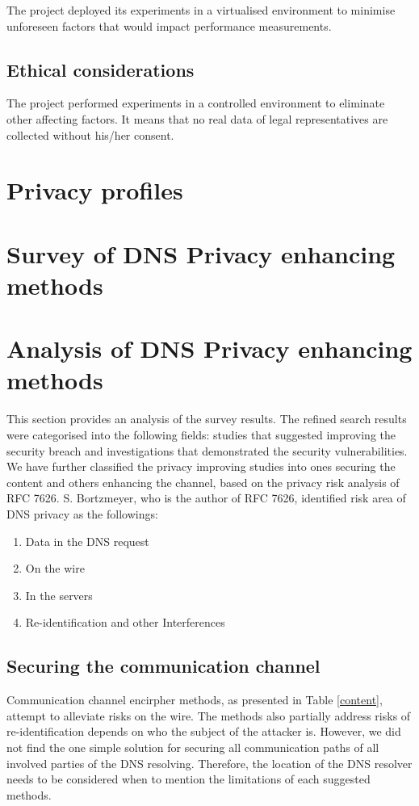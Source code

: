 \documentclass[a4paper,12pt]{article}
\begin{document}
The project deployed its experiments in a virtualised environment to minimise unforeseen factors that would impact performance measurements.

\subsection{Ethical considerations}
The project performed experiments in a controlled environment to eliminate other affecting factors. It means that no real data of legal representatives are collected without his/her consent. 

\newpage
\section{Privacy profiles}

\newpage
\section{Survey of DNS Privacy enhancing methods}

\section{Analysis of DNS Privacy enhancing methods}
This section provides an analysis of the survey results.
The refined search results were categorised into the following fields: studies that suggested improving the security breach and investigations that demonstrated the security vulnerabilities.
We have further classified the privacy improving studies into ones securing the content and others enhancing the channel, based on the privacy risk analysis of RFC 7626.
S. Bortzmeyer, who is the author of RFC 7626, identified risk area of DNS privacy as the followings\cite{rfc7626}: 
\begin{enumerate}
    \item Data in the DNS request
    \item On the wire
    \item In the servers
    \item Re-identification and other Interferences
\end{enumerate}

\subsection{Securing the communication channel}
Communication channel encirpher methods, as presented in Table \ref{content}, attempt to alleviate risks on the wire. The methods also partially address risks of re-identification depends on who the subject of the attacker is. 
However, we did not find the one simple solution for securing all communication paths of all involved parties of the DNS resolving. Therefore, the location of the DNS resolver needs to be considered when to mention the limitations of each suggested methods.
\end{document}
